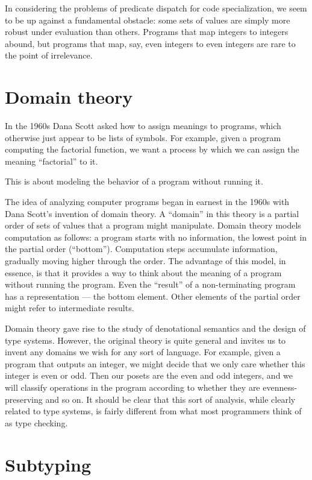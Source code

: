 In considering the problems of predicate dispatch for code specialization,
we seem to be up against a fundamental obstacle: some sets of values are
simply more robust under evaluation than others. Programs that map integers
to integers abound, but programs that map, say, even integers to even
integers are rare to the point of irrelevance.


\section{Domain theory}

In the 1960s Dana Scott asked how to assign meanings to programs,
which otherwise just appear to be lists of symbols.
For example, given a program computing the factorial function, we
want a process by which we can assign the meaning ``factorial'' to it.

This is about modeling the behavior of a program without running it.



The idea of analyzing computer programs began in earnest in the 1960s with
Dana Scott's invention of domain theory. A ``domain'' in this theory is a
partial order of sets of values that a program might manipulate. 
Domain theory models computation as follows: a program starts with no
information, the lowest point in the partial order (``bottom'').
Computation steps accumulate information, gradually moving higher through
the order. The advantage of this model, in essence, is that it provides a
way to think about the meaning of a program without running the program.
Even the ``result'' of a non-terminating program has a representation ---
the bottom element. Other elements of the partial order might refer to
intermediate results.


Domain theory gave rise to the study of denotational semantics and the
design of type systems. However, the original theory is quite general
and invites us to invent any domains we wish for any sort of language.
For example, given a program that outputs an integer, we might decide
that we only care whether this integer is even or odd. Then our posets
are the even and odd integers, and we will classify operations in the
program according to whether they are evenness-preserving and so on.
It should be clear that this sort of analysis, while clearly related
to type systems, is fairly different from what most programmers
think of as type checking.


\section{Subtyping}


